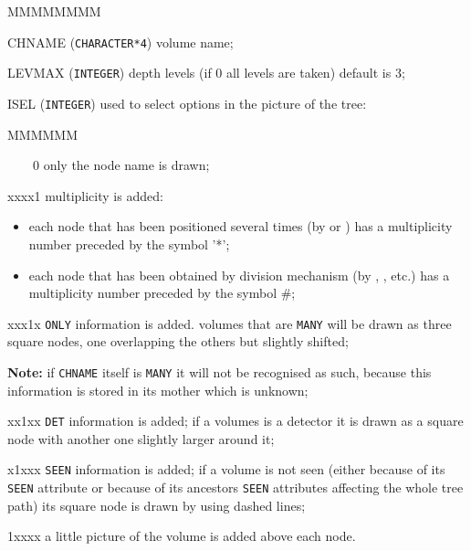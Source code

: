 \begin{DLtt}{MMMMMMMM}
\item[CHNAME]  ({\tt CHARACTER*4}) volume name;
\item[LEVMAX]  ({\tt INTEGER}) depth levels (if 0 all levels are taken) 
default is 3;
\item[ISEL]    ({\tt INTEGER}) used to select options in the picture of the tree:
\begin{DLtt}{MMMMMM}
\item[~~~~0] only the node name is drawn;
\item[xxxx1] multiplicity is added: 
\begin{itemize}
\item each node that has been positioned several 
times (by  or ) has a multiplicity number preceded by 
the symbol '*';
\item each node that has been obtained by division mechanism
(by , , etc.) has a multiplicity number preceded by the
symbol \#;
\end{itemize}
\item[xxx1x] {\tt ONLY} information is added.
volumes that are {\tt MANY} will be
drawn as three square nodes, one overlapping the others but slightly shifted;

{\bf Note:} if {\tt CHNAME} itself is {\tt MANY} it will not be recognised as 
such, because this information is stored in its mother which is unknown;

\item[xx1xx] {\tt DET} information is added; if a volumes is a detector it 
is drawn as a square node with another one slightly larger around it;
\item[x1xxx] {\tt SEEN} information is added;
if a volume is not seen (either because of its {\tt SEEN} attribute or
because of its ancestors {\tt SEEN} attributes affecting the whole tree path)
its square node is drawn by using dashed lines;
\item[1xxxx] a little picture of the volume is added above each node.
\end{DLtt}
\end{DLtt}

